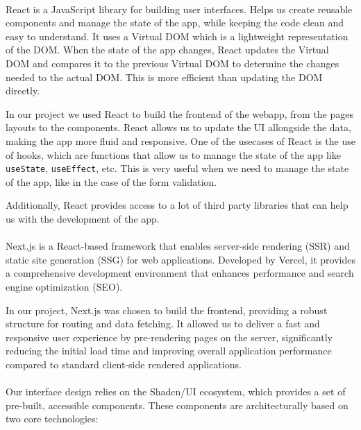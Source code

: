 

\paragraph{}React is a JavaScript library\cite{react} for building user interfaces. Helps us create reusable components and manage the state of the app, while keeping the code clean and easy to understand.
It uses a Virtual DOM which is a lightweight representation of the DOM. When the state of the app changes, React updates the Virtual DOM and compares it to the previous Virtual DOM to determine the changes needed to the actual DOM. This is more efficient than updating the DOM directly.

In our project we used React to build the frontend of the webapp, from the pages layouts to the components. React allows us to update the UI allongside the data, making the app more fluid and responsive. One of the usecases of React is the use of hooks, which are functions that allow us to manage the state of the app like \texttt{useState}, \texttt{useEffect}, etc. This is very useful when we need to manage the state of the app, like in the case of the form validation.

Additionally, React provides access to a lot of third party libraries that can help us with the development of the app.

\paragraph{}Next.js is a React-based framework\cite{nextjs} that enables server-side rendering (SSR) and static site generation (SSG) for web applications. Developed by Vercel, it provides a comprehensive development environment that enhances performance and search engine optimization (SEO).

In our project, Next.js was chosen to build the frontend, providing a robust structure for routing and data fetching. It allowed us to deliver a fast and responsive user experience by pre-rendering pages on the server, significantly reducing the initial load time and improving overall application performance compared to standard client-side rendered applications.

\paragraph{}Our interface design relies on the Shadcn/UI ecosystem, which provides a set of pre-built, accessible components. These components are architecturally based on two core technologies:

